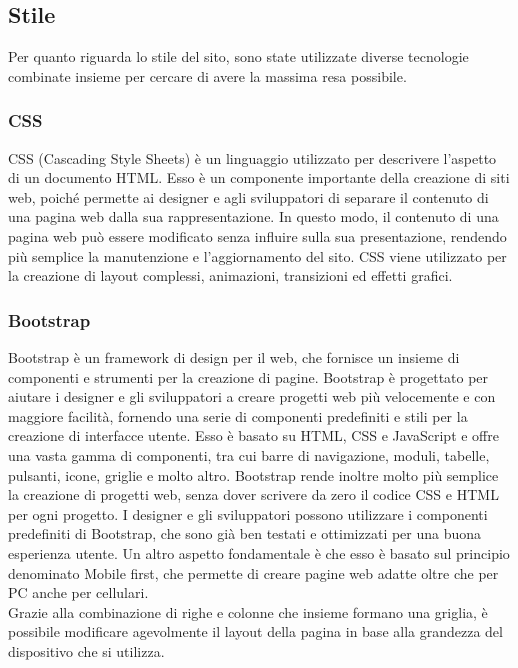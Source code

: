 \documentclass[a4paper,final,12pt]{report}
\begin{document}
\subsection{Stile}
Per quanto riguarda lo stile del sito, sono state utilizzate diverse tecnologie combinate insieme per cercare di avere la massima resa possibile.

\subsubsection{CSS}
CSS (Cascading Style Sheets) \cite{CSS} è un linguaggio utilizzato per descrivere l'aspetto di un documento HTML. Esso è un componente importante della creazione di siti web, poiché permette ai designer e agli sviluppatori di separare il contenuto di una pagina web dalla sua rappresentazione. In questo modo, il contenuto di una pagina web può essere modificato senza influire sulla sua presentazione, rendendo più semplice la manutenzione e l'aggiornamento del sito. CSS viene utilizzato per la creazione di layout complessi, animazioni, transizioni ed effetti grafici. 

\subsubsection{Bootstrap}
Bootstrap \cite{Bootstrap} è un framework di design per il web, che fornisce un insieme di componenti e strumenti per la creazione di pagine. Bootstrap è progettato per aiutare i designer e gli sviluppatori a creare progetti web più velocemente e con maggiore facilità, fornendo una serie di componenti predefiniti e stili per la creazione di interfacce utente. Esso è basato su HTML, CSS e JavaScript \cite{JavaScript} e offre una vasta gamma di componenti, tra cui barre di navigazione, moduli, tabelle, pulsanti, icone, griglie e molto altro.
Bootstrap rende inoltre molto più semplice la creazione di progetti web, senza dover scrivere da zero il codice CSS e HTML per ogni progetto. I designer e gli sviluppatori possono utilizzare i componenti predefiniti di Bootstrap, che sono già ben testati e ottimizzati per una buona esperienza utente.
Un altro aspetto fondamentale è che esso è basato sul principio denominato Mobile first, che permette di creare pagine web adatte oltre che per PC anche per cellulari.\\ Grazie alla combinazione di righe e colonne che insieme formano una griglia, è possibile modificare agevolmente il layout della pagina in base alla grandezza del dispositivo che si utilizza.
\end{document}

